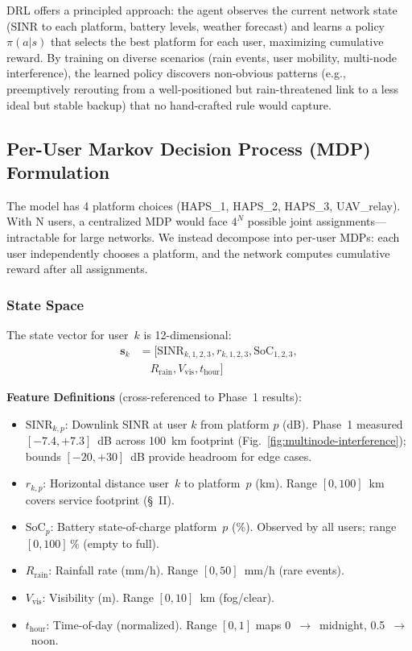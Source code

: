 \documentclass[conference]{IEEEtran}
\begin{document}
DRL offers a principled approach: the agent observes the current network state (SINR to each platform, battery levels, weather forecast) and learns a policy $\pi(a | s)$ that selects the best platform for each user, maximizing cumulative reward. By training on diverse scenarios (rain events, user mobility, multi-node interference), the learned policy discovers non-obvious patterns (e.g., preemptively rerouting from a well-positioned but rain-threatened link to a less ideal but stable backup) that no hand-crafted rule would capture.

\subsection{Per-User Markov Decision Process (MDP) Formulation}

The model has 4 platform choices (HAPS\_1, HAPS\_2, HAPS\_3, UAV\_relay). With N users, a centralized MDP would face $4^N$ possible joint assignments—intractable for large networks. We instead decompose into per-user MDPs: each user independently chooses a platform, and the network computes cumulative reward after all assignments.

\subsubsection{State Space}

The state vector for user~$k$ is 12-dimensional:
\begin{align}
\mathbf{s}_k &= [\text{SINR}_{k,1,2,3}, r_{k,1,2,3}, \text{SoC}_{1,2,3},\nonumber\\
&\quad R_{\text{rain}}, V_{\text{vis}}, t_{\text{hour}} ]
\label{eq:state-vector}
\end{align}

\noindent \textbf{Feature Definitions}
(cross-referenced to Phase~1 results):

\begin{itemize}\setlength{\itemsep}{0pt}
  \item $\text{SINR}_{k,p}$: Downlink SINR at user $k$ from platform $p$ (dB). Phase~1 measured $[-7.4, +7.3]$~dB across 100~km footprint (Fig.~\ref{fig:multinode-interference}); bounds $[-20, +30]$~dB provide headroom for edge cases.
  \item $r_{k,p}$: Horizontal distance user~$k$ to platform~$p$ (km). Range $[0, 100]$~km covers service footprint (§~II).
  \item $\text{SoC}_p$: Battery state-of-charge platform~$p$ (\%). Observed by all users; range $[0, 100]\,\%$ (empty to full).
  \item $R_{\text{rain}}$: Rainfall rate (mm/h). Range $[0, 50]$~mm/h (rare events).
  \item $V_{\text{vis}}$: Visibility (m). Range $[0, 10]$~km (fog/clear).
  \item $t_{\text{hour}}$: Time-of-day (normalized). Range $[0, 1]$ maps 0~$\to$~midnight, 0.5~$\to$~noon.
\end{itemize}
\end{document}
